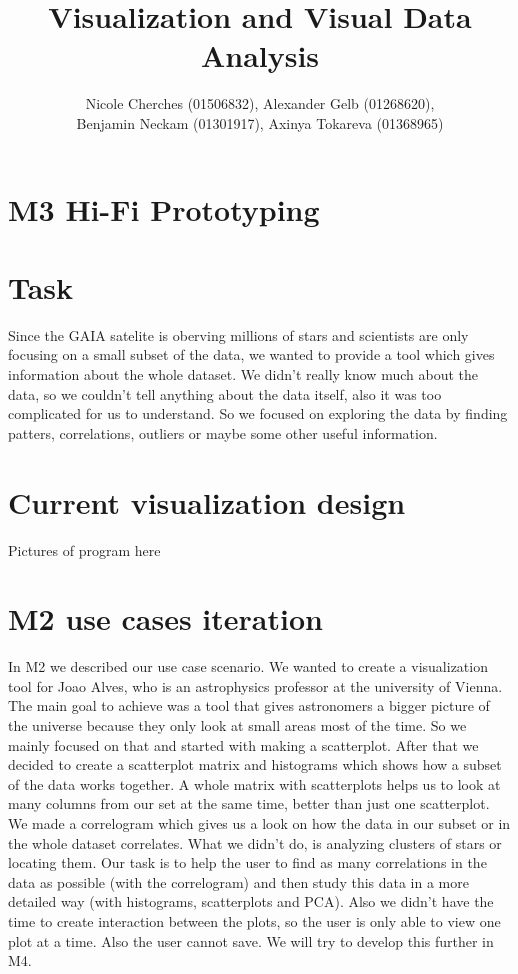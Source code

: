 \documentclass{article}
\begin{document}
\title{Visualization and Visual Data Analysis}
\author{Nicole Cherches (01506832), Alexander Gelb (01268620), \\Benjamin Neckam (01301917), Axinya Tokareva (01368965)}
\maketitle
\section*{M3  Hi-Fi Prototyping}
\section{Task}
Since the GAIA satelite is oberving millions of stars and scientists are only focusing on a small subset of the data, we wanted to provide a tool which gives information about the whole dataset. 
We didn't really know much about the data, so we couldn't tell anything about the data itself, also it was too complicated for us to understand. So we focused on exploring the data by finding patters, correlations, outliers or maybe some other useful information.\\
\section{Current visualization design}
{Pictures of program here}
\section{M2 use cases iteration}
In M2 we described our use case scenario. We wanted to create a visualization tool for Joao Alves, who is an astrophysics professor at the university of Vienna. The main goal to achieve was a tool that gives astronomers a bigger picture of the universe because they only look at small areas most of the time. So we mainly focused on that and started with making a scatterplot. After that we decided to create a scatterplot matrix and histograms which shows how a subset of the data works together. A whole matrix with scatterplots helps us to look at many columns from our set at the same time, better than just one scatterplot. We made a correlogram which gives us a look on how the data in our subset or in the whole dataset correlates. What we didn't do, is analyzing clusters of stars or locating them. Our task is to help the user to find as many correlations in the data as possible (with the correlogram) and then study this data in a more detailed way (with histograms, scatterplots and PCA). Also we didn't have the time to create interaction between the plots, so the user is only able to view one plot at a time. Also the user cannot save. We will try to develop this further in M4.
\end{document}
